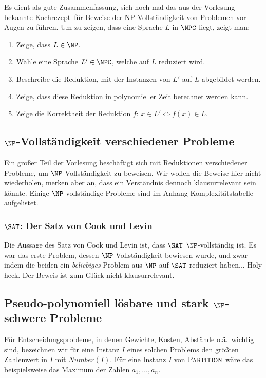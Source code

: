 \documentclass[a4paper,parskip=half*,DIV=7,fontsize=11pt]{scrartcl}
\begin{document}
Es dient als gute Zusammenfassung, sich noch mal das aus der Vorlesung bekannte \glqq Kochrezept\grqq\ für Beweise der NP-Vollständigkeit von Problemen vor Augen zu führen. Um zu zeigen, dass eine Sprache $L$ in $\NPC$ liegt, zeigt man:

\begin{enumerate}
\item Zeige, dass $L \in \NP$.
\item Wähle eine Sprache $L' \in \NPC$, welche auf $L$ reduziert wird.
\item Beschreibe die Reduktion, mit der Instanzen von $L'$ auf $L$ abgebildet werden.
\item Zeige, dass diese Reduktion in polynomieller Zeit berechnet werden kann.
\item Zeige die Korrektheit der Reduktion $f$: $x \in L' \iff f(x) \in L$.
\end{enumerate}

\subsection[NP-Vollständigkeit verschiedener Probleme]{$\NP$-Vollständigkeit verschiedener Probleme}

Ein großer Teil der Vorlesung beschäftigt sich mit Reduktionen verschiedener Probleme, um $\NP$-Vollständigkeit zu beweisen. Wir wollen die Beweise hier nicht wiederholen, merken aber an, dass ein Verständnis dennoch klausurrelevant sein könnte. Einige $\NP$-vollständige Probleme sind im Anhang Komplexitätstabelle aufgelistet.

\subsubsection[SAT: Der Satz von Cook und Levin]{$\SAT$: Der Satz von Cook und Levin}
Die Aussage des Satz von Cook und Levin ist, dass $\SAT$ $\NP$-vollständig ist. Es war das erste Problem, dessen $\NP$-Vollständigkeit bewiesen wurde, und zwar indem die beiden ein \textit{beliebiges} Problem aus $\NP$ auf $\SAT$ reduziert haben... Holy heck. Der Beweis ist zum Glück nicht klausurrelevant.

\subsection{Pseudo-polynomiell lösbare und stark $\NP$-schwere Probleme}
Für Entscheidungsprobleme, in denen Gewichte, Kosten, Abstände o.ä.\ wichtig sind, bezeichnen wir für eine Instanz $I$ eines solchen Problems den größten Zahlenwert in $I$ mit $Number(I)$. Für eine Instanz $I$ von $\textsc{Partition}$ wäre das beispielsweise das Maximum der Zahlen $a_1,\dots,a_n$.
\end{document}
